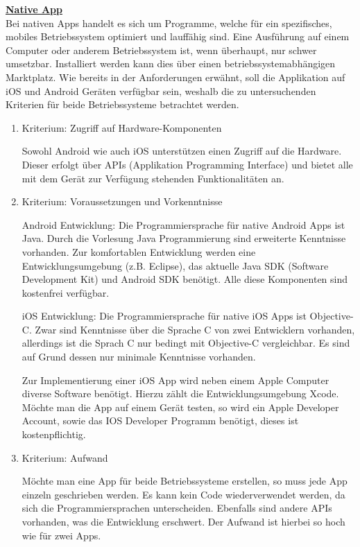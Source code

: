 


\textbf{\underline{Native App}}\\
Bei nativen Apps handelt es sich um Programme, welche für ein spezifisches, mobiles 
Betriebssystem optimiert und lauffähig sind. Eine Ausführung auf einem Computer oder anderem 
Betriebssystem ist, wenn überhaupt, nur schwer umsetzbar.
Installiert werden kann dies über einen betriebssystemabhängigen Marktplatz. Wie 
bereits in der Anforderungen erwähnt, soll die Applikation auf iOS und Android 
Geräten verfügbar sein, weshalb die zu untersuchenden Kriterien für beide 
Betriebssysteme betrachtet werden.

\begin{enumerate}
\item Kriterium: Zugriff auf Hardware-Komponenten

Sowohl Android wie auch iOS unterstützen einen Zugriff auf die Hardware. 
Dieser erfolgt über APIs (Applikation Programming Interface) und bietet alle mit 
dem Gerät zur Verfügung stehenden Funktionalitäten an.

\item Kriterium: Voraussetzungen und Vorkenntnisse

Android Entwicklung:
Die Programmiersprache für native Android Apps ist Java. Durch die Vorlesung Java 
Programmierung sind erweiterte Kenntnisse vorhanden. Zur komfortablen Entwicklung 
werden eine Entwicklungsumgebung (z.B. Eclipse), das aktuelle Java SDK (Software 
Development Kit) und Android SDK benötigt. Alle diese Komponenten sind kostenfrei 
verfügbar.

iOS Entwicklung:
Die Programmiersprache für native iOS Apps ist Objective-C. Zwar sind Kenntnisse 
über die Sprache C von zwei Entwicklern vorhanden, allerdings ist die Sprach C nur 
bedingt mit Objective-C vergleichbar. Es sind auf Grund dessen nur minimale 
Kenntnisse vorhanden.

Zur Implementierung einer iOS App wird neben einem Apple Computer diverse Software 
benötigt. Hierzu zählt die Entwicklungsumgebung Xcode. Möchte man die App auf einem 
Gerät testen, so wird ein Apple Developer Account, sowie das IOS Developer Programm benötigt, 
dieses ist kostenpflichtig.



\item Kriterium: Aufwand

Möchte man eine App für beide Betriebssysteme erstellen, so muss jede App einzeln 
geschrieben werden. Es kann kein Code wiederverwendet werden, da sich die 
Programmiersprachen unterscheiden. Ebenfalls sind andere APIs vorhanden, was die 
Entwicklung erschwert. Der Aufwand ist hierbei so hoch wie für zwei Apps. 
\end{enumerate}

